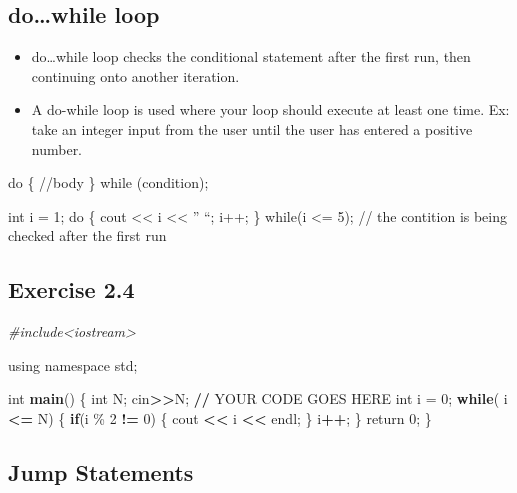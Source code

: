 \documentclass[
]{article}
\newenvironment{Shaded}{\begin{snugshade}}{\end{snugshade}}
\newcommand{\CommentTok}[1]{\textcolor[rgb]{0.56,0.35,0.01}{\textit{#1}}}
\newcommand{\ControlFlowTok}[1]{\textcolor[rgb]{0.13,0.29,0.53}{\textbf{#1}}}
\newcommand{\DecValTok}[1]{\textcolor[rgb]{0.00,0.00,0.81}{#1}}
\newcommand{\ErrorTok}[1]{\textcolor[rgb]{0.64,0.00,0.00}{\textbf{#1}}}
\newcommand{\FunctionTok}[1]{\textcolor[rgb]{0.13,0.29,0.53}{\textbf{#1}}}
\newcommand{\NormalTok}[1]{#1}
\newcommand{\OtherTok}[1]{\textcolor[rgb]{0.56,0.35,0.01}{#1}}
\newcommand{\SpecialCharTok}[1]{\textcolor[rgb]{0.81,0.36,0.00}{\textbf{#1}}}
\providecommand{\tightlist}{%
  \setlength{\itemsep}{0pt}\setlength{\parskip}{0pt}}
\begin{document}
\subsection{do\ldots while loop}\label{dowhile-loop}

\begin{itemize}
\tightlist
\item
  do\ldots while loop checks the conditional statement after the first
  run, then continuing onto another iteration.
\item
  A do-while loop is used where your loop should execute at least one
  time. Ex: take an integer input from the user until the user has
  entered a positive number.
\end{itemize}

do \{ //body \} while (condition);

int i = 1; do \{ cout \textless\textless{} i \textless\textless{} '' ``;
i++; \} while(i \textless= 5); // the contition is being checked after
the first run

\subsection{Exercise 2.4}\label{exercise-2.4}

\begin{Shaded}
\begin{Highlighting}[]
\CommentTok{\#include\textless{}iostream\textgreater{}}

\NormalTok{using namespace std;}

\NormalTok{int }\FunctionTok{main}\NormalTok{()  \{}
\NormalTok{    int N;}
\NormalTok{    cin}\SpecialCharTok{\textgreater{}}\ErrorTok{\textgreater{}}\NormalTok{N;}
    \SpecialCharTok{/}\ErrorTok{/}\NormalTok{ YOUR CODE GOES HERE}
\NormalTok{    int i }\OtherTok{=} \DecValTok{0}\NormalTok{;}
    \ControlFlowTok{while}\NormalTok{( i }\SpecialCharTok{\textless{}=}\NormalTok{ N) \{}
        \ControlFlowTok{if}\NormalTok{(i \% }\DecValTok{2} \SpecialCharTok{!=} \DecValTok{0}\NormalTok{) \{}
\NormalTok{            cout }\SpecialCharTok{\textless{}}\ErrorTok{\textless{}}\NormalTok{ i }\SpecialCharTok{\textless{}}\ErrorTok{\textless{}}\NormalTok{ endl;}
\NormalTok{        \}}
\NormalTok{        i}\SpecialCharTok{++}\NormalTok{;}
\NormalTok{    \}}
\NormalTok{    return }\DecValTok{0}\NormalTok{;}
\NormalTok{\}}
\end{Highlighting}
\end{Shaded}

\subsection{Jump Statements}\label{jump-statements}
\end{document}
